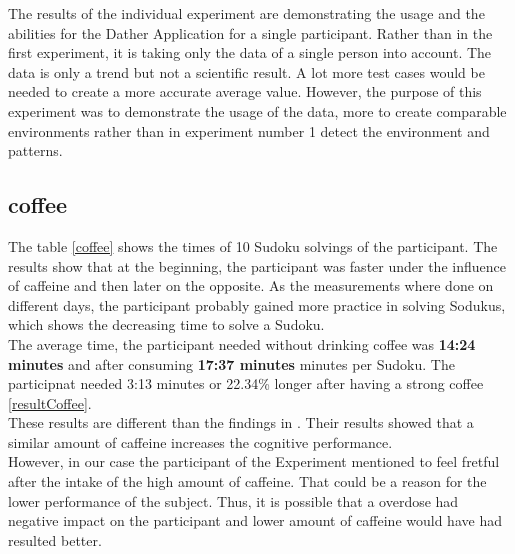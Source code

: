 The results of the individual experiment are demonstrating the usage and the abilities for the Dather Application for a single participant. Rather than in the first experiment, it is taking only the data of a single person into account.
The data is only a trend but not a scientific result. A lot more test cases would be needed to create a more accurate average value. However, the purpose of this experiment was to demonstrate the usage of the data, more to create comparable environments rather than in experiment number 1 detect the environment and patterns. 


\subsection{coffee}
The table \ref{coffee} shows the times of 10 Sudoku solvings of the participant. The results show that at the beginning, the participant was faster under the influence of caffeine and then later on the opposite. As the measurements where done on different days, the participant probably gained more practice in solving Sodukus, which shows the decreasing time to solve a Sudoku.
\\
The average time, the participant needed without drinking coffee was \textbf{14:24 minutes} and after consuming \textbf{17:37 minutes} minutes per Sudoku. The participnat needed 3:13 minutes or 22.34\%  longer after having a strong coffee \ref{resultCoffee}.\\
These results are different than the findings in \cite{liguori1997absorption}. Their results showed that a similar amount of caffeine increases the cognitive performance. \\
However, in our case the participant of the Experiment mentioned to feel fretful after the intake of the high amount of caffeine. That could be a reason for the lower performance of the subject. Thus, it is possible that a overdose had negative impact on the participant and lower amount of caffeine would have had resulted better. 

\FloatBarrier

